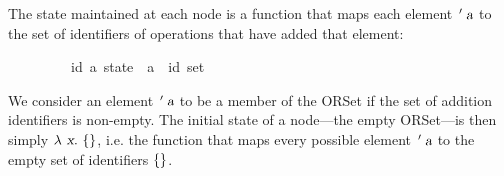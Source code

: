 The state maintained at each node is a function that maps each element $\isacharprime\isa{a}$ to the set of identifiers of operations that have added that element:
\vspace{0.275em}
\begin{isabellebody}
\ \ \ \ \ \ \ \ \ {\isacharparenleft}{\isacharprime}id{\isacharcomma}\ {\isacharprime}a{\isacharparenright}\ state\ {\isacharequal}\ {\isachardoublequoteopen}{\isacharprime}a\ {\isasymRightarrow}\ {\isacharprime}id\ set{\isachardoublequoteclose}
\end{isabellebody}
\vspace{0.275em}
We consider an element $\isacharprime\isa{a}$ to be a member of the ORSet if the set of addition identifiers is non-empty.
The initial state of a node---the empty ORSet---is then simply $\isasymlambda\isa{x}\isachardot\ \isacharbraceleft\isacharbraceright$, i.e. the function that maps every possible element $\isacharprime\isa{a}$ to the empty set of identifiers $\emph{$\{$}\emph{$\}$}$.

